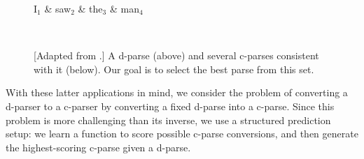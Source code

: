 \documentclass[11pt,letterpaper]{article}
\newcommand{\nascomment}[1]{\textcolor{blue}{\bf \small [#1 --nas]}}
\begin{document}
\begin{figure}
  \centering

  \vspace{-1cm}

  \begin{dependency}[theme=simple]
    \begin{deptext}[column sep=0.7cm]
      I$_1$ \& saw$_2$ \& the$_3$ \& man$_4$ \\
    \end{deptext}
  \end{dependency}

 \\

  
  \label{fig:inverse}
  \caption{{\footnotesize 
      [Adapted from \cite{collins1999statistical}.] A d-parse (above)
      and several c-parses consistent with it (below).  Our goal is to select
      the best parse from this set.
    }
    }
\end{figure}


With these latter applications in mind, we consider the problem of converting
a d-parser to a c-parser by converting a fixed d-parse into a c-parse.
Since this problem is more challenging than its inverse, we use a
structured prediction setup: we learn a function to score possible
c-parse conversions, and then generate the highest-scoring c-parse
given a d-parse.



\end{document}
